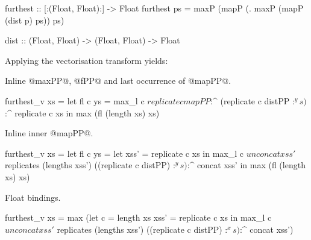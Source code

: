 \begin{small}
\begin{code}
 furthest :: [:(Float, Float):] -> Float
 furthest ps = maxP (mapP (\p. maxP (mapP (dist p) ps)) ps)

 dist :: (Float, Float) -> (Float, Float) -> Float
\end{code}
\end{small}
%
Applying the vectorisation transform yields:
%
\begin{small}
\end{small}
%
Inline @maxPP@, @fPP@ and last occurrence of @mapPP@.
%
\begin{small}
\begin{code}
 furthest_v xs
  = let fl c ys  = max_l c 
                 $ replicate c mapPP 
                     $:^ (replicate c distPP $:^ ys)
                     $:^ replicate c xs
  in    max (fl (length xs) xs)
\end{code}
\end{small}
%
Inline inner @mapPP@.
%
\begin{small}
\begin{code}
 furthest_v xs
  = let fl c ys  
         = let xss'     = replicate c xs
           in  max_l c 
                $   unconcat xss'
                $   replicates (lengths xss') 
                     ((replicate c distPP) $:^ ys)
                $:^ concat xss'
    in  max (fl (length xs) xs)
\end{code}
\end{small}
%
Float bindings.
%
\begin{small}
\begin{code}
 furthest_v xs
  = max (let c    = length xs
             xss' = replicate c xs
         in  max_l c 
              $   unconcat xss'
              $   replicates (lengths xss') 
                   ((replicate c distPP) $:^ xs)
              $:^ concat xss')
\end{code}
\end{small}

